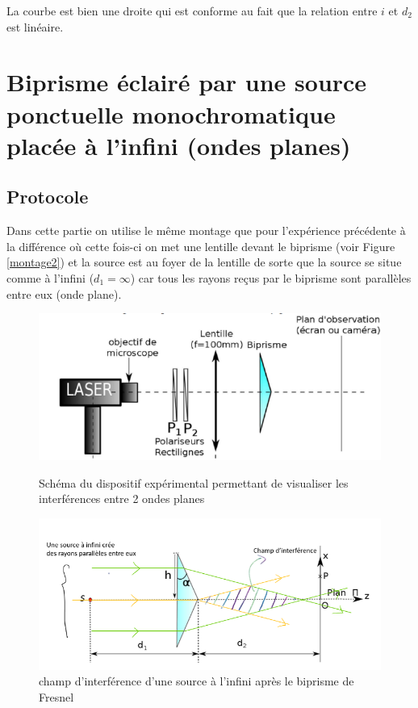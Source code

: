 \documentclass[11pt, a4paper]{article}
\begin{document}
La courbe est bien une droite qui est conforme au fait que la relation entre $i$ et $d_2$ est linéaire.


\section{Biprisme éclairé par une source ponctuelle monochromatique placée à l'infini (ondes planes)}
\subsection{Protocole}
Dans cette partie on utilise le même montage que pour l'expérience précédente à la différence où cette fois-ci on met une lentille devant le biprisme (voir Figure \ref{montage2}) et la source est au foyer de la lentille de sorte que la source se situe comme à l'infini ($d_1=\infty$) car tous les rayons reçus par le biprisme sont parallèles entre eux (onde plane).

\begin{figure}[htbp]
    \centering
    \begin{minipage}[t]{0.48\textwidth}
        \centering
        \includegraphics[width=\textwidth]{images/montage2.png}
        \caption{Schéma du dispositif expérimental permettant de visualiser les interférences entre 2 ondes planes}
        \label{montage2}
    \end{minipage}
    \hfill
    \begin{minipage}[t]{0.48\textwidth}
        \centering
        \includegraphics[width=\textwidth]{images/champs2.png}
        \caption{champ d'interférence d'une source à l'infini après le biprisme de Fresnel}
        \label{champs2}
    \end{minipage}
\end{figure}
\end{document}
